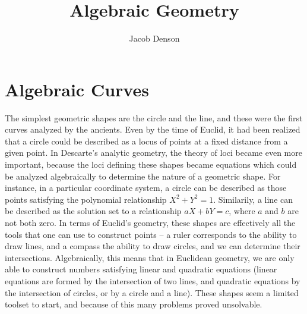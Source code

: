 

\title{Algebraic Geometry}
\author{Jacob Denson}



\maketitle
\tableofcontents
{}

\part{Algebraic Curves}

The simplest geometric shapes are the circle and the line, and these were the first curves analyzed by the ancients. Even by the time of Euclid, it had been realized that a circle could be described as a locus of points at a fixed distance from a given point. In Descarte's analytic geometry, the theory of loci became even more important, because the loci defining these shapes became equations which could be analyzed algebraically to determine the nature of a geometric shape. For instance, in a particular coordinate system, a circle can be described as those points satisfying the polynomial relationship $X^2 + Y^2 = 1$. Similarily, a line can be described as the solution set to a relationship $aX + bY = c$, where $a$ and $b$ are not both zero. In terms of Euclid's geometry, these shapes are effectively all the tools that one can use to construct points -- a ruler corresponds to the ability to draw lines, and a compass the ability to draw circles, and we can determine their intersections. Algebraically, this means that in Euclidean geometry, we are only able to construct numbers satisfying linear and quadratic equations (linear equations are formed by the intersection of two lines, and quadratic equations by the intersection of circles, or by a circle and a line). These shapes seem a limited toolset to start, and because of this many problems proved unsolvable.
%
